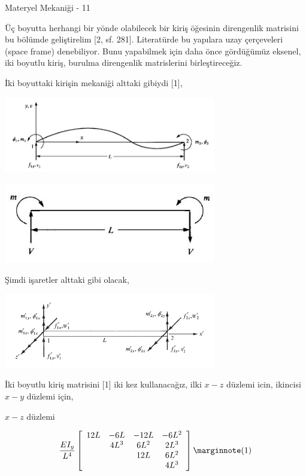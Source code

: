 \documentclass[12pt,fleqn]{article}\usepackage{../../common}
\begin{document}
Materyel Mekaniği - 11

Üç boyutta herhangi bir yönde olabilecek bir kiriş öğesinin direngenlik
matrisini bu bölümde geliştirelim [2, sf. 281]. Literatürde bu yapılara uzay
çerçeveleri (space frame) denebiliyor. Bunu yapabilmek için daha önce gördüğümüz
eksenel, iki boyutlu kiriş, burulma direngenlik matrislerini birleştireceğiz.

İki boyuttaki kirişin mekaniği alttaki gibiydi [1],

\includegraphics[width=25em]{phy_020_strs_11_02.jpg}

\includegraphics[width=25em]{phy_020_strs_11_03.jpg}

Şimdi işaretler alttaki gibi olacak,

\includegraphics[width=25em]{phy_020_strs_11_01.jpg}

İki boyutlu kiriş matrisini [1] iki kez kullanacağız, ilki $x-z$ düzlemi icin,
ikincisi $x-y$ düzlemi için,

$x-z$ düzlemi

$$
\frac{EI_y}{L^4}
\left[\begin{array}{cccc}
12L & -6L  & -12L & -6L^2 \\
    & 4L^3 & 6L^2 & 2L^3  \\
    &      & 12L  & 6L^2  \\
    &      &      & 4L^3
\end{array}\right]
\mlabel{1}
$$
\end{document}
